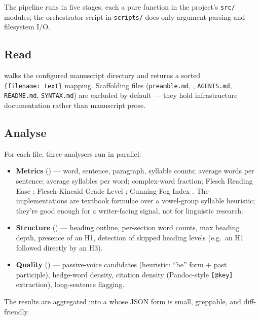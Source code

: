 \documentclass[
]{article}
\begin{document}
The pipeline runs in five stages, each a pure function in the project's
\texttt{src/} modules; the orchestrator script in \texttt{scripts/} does
only argument parsing and filesystem I/O.

\subsection{Read}\label{read}

 walks the configured
manuscript directory and returns a sorted \texttt{\{filename:\ text\}}
mapping. Scaffolding files (\texttt{preamble.md},
, \texttt{AGENTS.md}, \texttt{README.md},
\texttt{SYNTAX.md}) are excluded by default --- they hold infrastructure
documentation rather than manuscript prose.

\subsection{Analyse}\label{analyse}

For each file, three analysers run in parallel:

\begin{itemize}
\item
  \textbf{Metrics} () ---
  word, sentence, paragraph, syllable counts; average words per
  sentence; average syllables per word; complex-word fraction; Flesch
  Reading Ease \citep{flesch1948new}; Flesch-Kincaid Grade Level
  \citep{kincaid1975derivation}; Gunning Fog Index
  \citep{gunning1952technique}. The implementations are textbook
  formulae over a vowel-group syllable heuristic; they're good enough
  for a writer-facing signal, not for linguistic research.
\item
  \textbf{Structure} ()
  --- heading outline, per-section word counts, max heading depth,
  presence of an H1, detection of skipped heading levels (e.g.~an H1
  followed directly by an H3).
\item
  \textbf{Quality} () ---
  passive-voice candidates (heuristic: ``be'' form + past participle),
  hedge-word density, citation density (Pandoc-style \texttt{{[}@key{]}}
  extraction), long-sentence flagging.
\end{itemize}

The results are aggregated into a  whose JSON
form is small, greppable, and diff-friendly.
\end{document}
